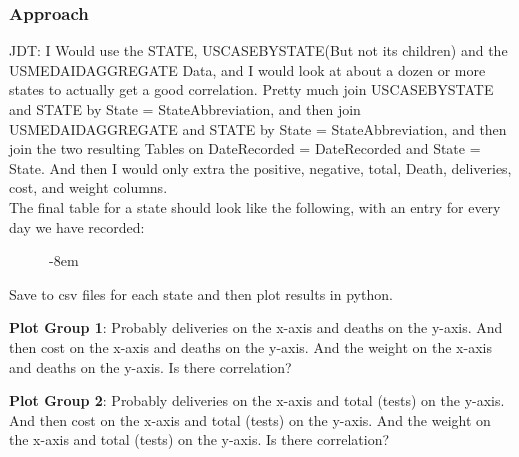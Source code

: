 \documentclass[11pt]{article}
\begin{document}
\subsubsection{Approach}

\noindent
JDT: I Would use the STATE, USCASEBYSTATE(But not its children) and the USMEDAIDAGGREGATE Data, and I would look at about a dozen or more states to actually get a good correlation. Pretty much join USCASEBYSTATE and STATE by State = StateAbbreviation, and then join USMEDAIDAGGREGATE and STATE by State = StateAbbreviation, and then join the two resulting Tables on DateRecorded = DateRecorded and State = State. And then I would only extra the positive, negative, total, Death, deliveries, cost, and weight columns. \\

\noindent
The final table for a state should look like the following, with an entry for every day we have recorded:

\begin{figure}[H]
\begin{adjustwidth*}{}{-8em}
\centering
{}%
\end{adjustwidth*}
\end{figure}

\noindent
Save to csv files for each state and then plot results in python. 

\noindent
\textbf{Plot Group 1}: Probably deliveries on the x-axis and deaths on the y-axis. And then cost on the x-axis and deaths on the y-axis. And the weight on the x-axis and deaths on the y-axis. Is there correlation?

\noindent
\textbf{Plot Group 2}: Probably deliveries on the x-axis and total (tests) on the y-axis. And then cost on the x-axis and total (tests) on the y-axis. And the weight on the x-axis and total (tests) on the y-axis. Is there correlation?
\end{document}
